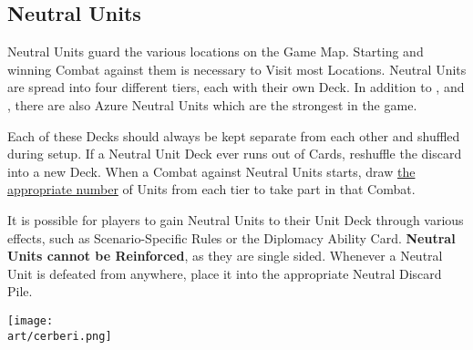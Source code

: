 \begin{multicols}{2}
\subsection*{\hypertarget{Neutral Units}{Neutral Units}}
Neutral Units guard the various locations on the Game Map.
Starting and winning Combat against them is necessary to Visit most Locations.
Neutral Units are spread into four different tiers, each with their own Deck.
In addition to ,  and , there are also Azure  Neutral Units which are the strongest in the game.\par
Each of these Decks should always be kept separate from each other and shuffled during setup.
If a Neutral Unit Deck ever runs out of Cards, reshuffle the discard into a new Deck.
When a Combat against Neutral Units starts, draw \hyperlink{Difficulty}{the appropriate number} of Units from each tier to take part in that Combat.\par
It is possible for players to gain Neutral Units to their Unit Deck through various effects, such as Scenario-Specific Rules or the Diplomacy Ability Card.
\textbf{Neutral Units cannot be Reinforced}, as they are single sided.
Whenever a Neutral Unit is defeated from anywhere, place it into the appropriate Neutral Discard Pile.\par

\vfill
\hfill\texttt{[image: \\art/cerberi.png]}

\end{multicols}


